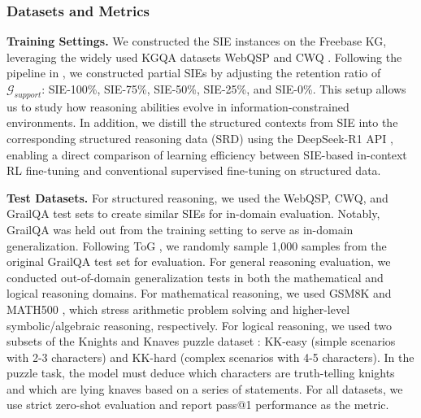 \documentclass{article} %
\begin{document}
\subsubsection{Datasets and Metrics}
\textbf{Training Settings.} We constructed the SIE instances on the Freebase KG, leveraging the widely used KGQA datasets WebQSP \citep{yih2016value} and CWQ \citep{talmor2018web}. 
Following the pipeline in , we constructed partial SIEs by adjusting the retention ratio of $\mathcal{G}_{support}$: SIE-100\%, SIE-75\%, SIE-50\%, SIE-25\%, and SIE-0\%. This setup allows us to study how reasoning abilities evolve in information-constrained environments. 
In addition, we distill the structured contexts from SIE into the corresponding structured reasoning data (SRD) using the DeepSeek-R1 API \citep{guo2025deepseek}, enabling a direct comparison of learning efficiency between SIE-based in-context RL fine-tuning and conventional supervised fine-tuning on structured data.

\textbf{Test Datasets.} For structured reasoning, we used the WebQSP, CWQ, and GrailQA \citep{gu2021beyond} test sets to create similar SIEs for in-domain evaluation. Notably, GrailQA was held out from the training setting to serve as in-domain generalization. Following ToG \citep{sun2023think}, we randomly sample 1,000 samples from the original GrailQA test set for evaluation. For general reasoning evaluation, we conducted out-of-domain generalization tests in both the mathematical and logical reasoning domains. For mathematical reasoning, we used GSM8K \citep{cobbe2021training} and MATH500 \citep{lightman2023let}, which stress arithmetic problem solving and higher-level symbolic/algebraic reasoning, respectively. For logical reasoning, we used two subsets of the Knights and Knaves puzzle dataset \citep{xie2024memorization}: KK-easy (simple scenarios with 2-3 characters) and KK-hard (complex scenarios with 4-5 characters). In the puzzle task, the model must deduce which characters are truth-telling knights and which are lying knaves based on a series of statements. For all datasets, we use strict zero-shot evaluation and report pass@1 performance as the metric.
\end{document}
